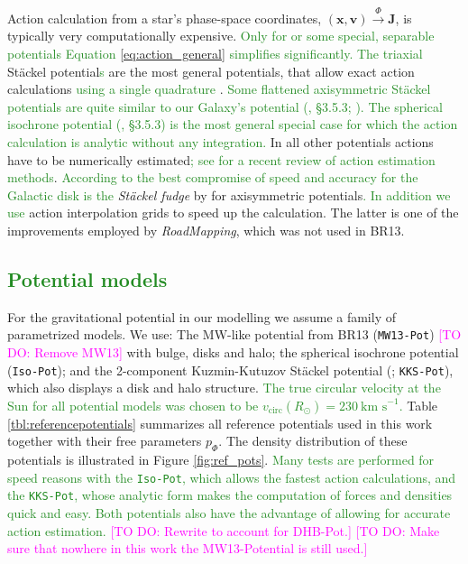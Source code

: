 \documentclass[iop,revtex4]{emulateapj}
\newcommand{\vect}[1]{\boldsymbol{#1}}
\newcommand{\RM}{{\sl RoadMapping}}
\newcommand{\NEW}[1]{\textcolor{ForestGreen}{#1}}
\newcommand{\Wilma}[1]{\textcolor{Magenta}{#1}}
\newcommand{\OLD}[1]{}
\begin{document}
Action calculation from a star's phase-space coordinates, $(\vect{x},\vect{v}) \stackrel{\Phi}{\longrightarrow} \vect{J}$, is typically very computationally expensive. \NEW{Only for or some special, separable potentials Equation \eqref{eq:action_general} simplifies significantly.} \OLD{The spherical isochrone potential 1959AnAp...22..126H and axisymmetric}\NEW{The triaxial} St\"{a}ckel potential\NEW{s} \citep{1985MNRAS.216..273D} are the most general  \OLD{(Galactic)} potentials, that allow exact action calculations \NEW{using a single quadrature} \OLD{(2008gady.book.....B, \S 3.5.2 and \S 3.5.3)}. \NEW{Some flattened axisymmetric St\"{a}ckel potentials are quite similar to our Galaxy's potential (\citealt{2008gady.book.....B}, \S 3.5.3; \citealt{1994AA...287...43B,2003MNRAS.340..752F}). The spherical isochrone potential (\citealt{1959AnAp...22..126H,2008gady.book.....B}, \S 3.5.3) is the most general special case for which the action calculation is analytic without any integration.} In all other potentials actions have to be numerically estimated\NEW{; see \citet{2016MNRAS.457.2107S} for a recent review of action estimation methods}. \NEW{According to \citet{2016MNRAS.457.2107S} the best compromise of speed and accuracy for the Galactic disk is the} \OLD{We use the} \emph{St\"{a}ckel fudge} by \citet{2012MNRAS.426.1324B} for axisymmetric potentials\NEW{. In addition we use} \OLD{and} action interpolation grids \citep{2012MNRAS.426.1324B,2015ApJS..216...29B} to speed up the calculation. The latter is one of the improvements employed by \RM{}, which was not used in BR13. 

\subsection{\NEW{Potential models}} %

For the gravitational potential in our modelling we assume a family of parametrized models. We use: The MW-like potential from BR13 (\texttt{MW13-Pot}) \Wilma{[TO DO: Remove MW13]} with bulge, disks and halo; the spherical isochrone potential (\texttt{Iso-Pot}); and the 2-component Kuzmin-Kutuzov St\"{a}ckel potential (\citealt{1994AA...287...43B}; \texttt{KKS-Pot}), which also displays a disk and halo structure. \NEW{The true circular velocity at the Sun for all potential models was chosen to be $v_\text{circ}(R_\odot)=230~\text{km s}^{-1}$.} Table \ref{tbl:referencepotentials} summarizes all reference potentials used in this work together with their free parameters $p_\Phi$. The density distribution of these potentials is illustrated in Figure \ref{fig:ref_pots}. \NEW{Many tests are performed for speed reasons with the \texttt{Iso-Pot}, which allows the fastest action calculations, and the \texttt{KKS-Pot}, whose analytic form makes the computation of forces and densities quick and easy. Both potentials also have the advantage of allowing for accurate action estimation.}
\Wilma{[TO DO: Rewrite to account for DHB-Pot.]}
\Wilma{[TO DO: Make sure that nowhere in this work the MW13-Potential is still used.]}
\end{document}
